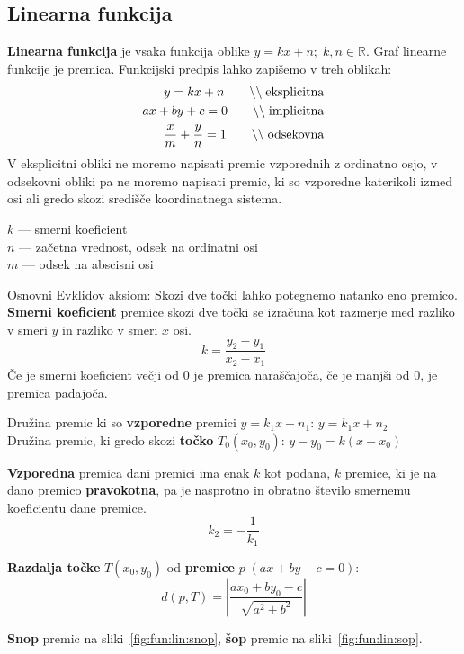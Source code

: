 \documentclass[a4paper,oneside,12pt,fleqn]{article}
\def\R{\ensuremath{\mathbb R}}
\newcommand{\comment}[1]{\ensuremath{\qquad\backslash\backslash\;}\textnormal{#1}}
\numberwithin{equation}{section}
\begin{document}
\subsection{Linearna funkcija}
\textbf{Linearna funkcija} je vsaka funkcija oblike $y = kx + n; \; k, n \in \R$.
Graf linearne funkcije je premica. Funkcijski predpis lahko zapišemo v treh oblikah:
\label{sec:fun:lin}
\begin{align*}
  y = kx + n \comment{eksplicitna} \\
  ax + by + c = 0 \comment{implicitna} \\
  \frac{x}{m} + \frac{y}{n} = 1 \comment{odsekovna}
\end{align*}
V eksplicitni obliki ne moremo napisati premic vzporednih z ordinatno osjo, v odsekovni
obliki pa ne moremo napisati premic, ki so vzporedne katerikoli izmed osi ali gredo skozi
središče koordinatnega sistema.

$k$ --- smerni koeficient \\
$n$ --- začetna vrednost, odsek na ordinatni osi \\
$m$ --- odsek na abscisni osi

Osnovni Evklidov aksiom: Skozi dve točki lahko potegnemo natanko eno premico.
\textbf{Smerni koeficient} premice skozi dve točki se izračuna kot razmerje med razliko v smeri $y$
in razliko v smeri $x$ osi.
\[ k = \frac{y_2 - y_1}{x_2 - x_1} \]
Če je smerni koeficient večji od 0 je premica naraščajoča, če je manjši od 0, je premica
padajoča.

Družina premic ki so \textbf{vzporedne} premici $y = k_1x+n_1$: $y=k_1x+n_2$ \\
Družina premic, ki gredo skozi \textbf{točko} $T_0(x_0,y_0)$: $y - y_0 = k(x-x_0)$ 

\textbf{Vzporedna} premica dani premici ima enak $k$ kot podana, $k$ premice, ki je na dano premico
\textbf{pravokotna}, pa je nasprotno in obratno število smernemu koeficientu dane premice.
\[ k_2 = -\frac{1}{k_1} \]

\textbf{Razdalja točke} $T(x_0, y_0)$ od \textbf{premice} $p\;(ax+by-c=0)$:
\[ d(p, T) = \left|\frac{ax_0+by_0-c}{\sqrt{a^2+b^2}}\right|  \]

\textbf{Snop} premic na sliki~\ref{fig:fun:lin:snop}, \textbf{šop} premic na sliki~\ref{fig:fun:lin:sop}.
\end{document}
